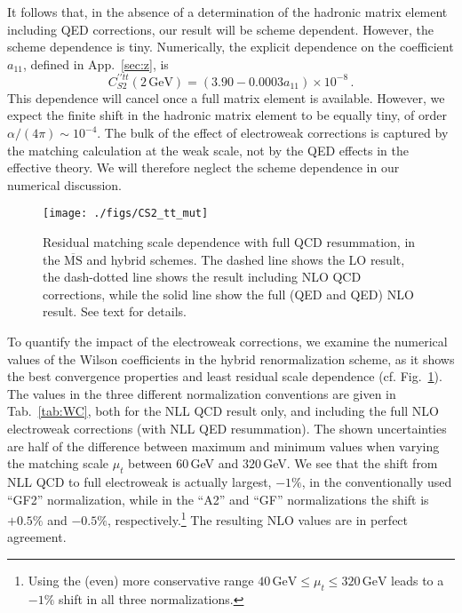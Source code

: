 \documentclass[letter,11pt,DIV=12,abstract=true,numbers=noenddot,titlepage=false,twocolumn=false,draft=false]{scrartcl}
\newcommand{\MS}{$\overline{\text{MS}}$}
\begin{document}
It follows that, in the absence of a determination of the hadronic
matrix element including QED corrections, our result will be scheme
dependent. However, the scheme dependence is tiny. Numerically, the
explicit dependence on the coefficient $a_{11}$, defined in
App.~\ref{sec:z}, is
\begin{equation}
  C_{S2}^{\prime \prime tt}(2\,\text{GeV}) = (3.90 - 0.0003 a_{11} ) \times 10^{-8} \,.
\end{equation}
This dependence will cancel once a full matrix element is
available. However, we expect the finite shift in the hadronic matrix
element to be equally tiny, of order $\alpha/(4\pi) \sim 10^{-4}$. The
bulk of the effect of electroweak corrections is captured by the
matching calculation at the weak scale, not by the QED effects in the
effective theory. We will therefore neglect the scheme dependence in
our numerical discussion.

\begin{figure}[t]
        \centering
        \texttt{[image: ./figs/CS2\_tt\_mut]}
        \caption{Residual matching scale dependence with full QCD
          resummation, in the \MS{} and hybrid schemes. The dashed
          line shows the LO result, the dash-dotted line shows the
          result including NLO QCD corrections, while the solid line
          show the full (QED and QED) NLO result. See text for
          details.
	\label{fig:qcd}}
\end{figure}

To quantify the impact of the electroweak corrections, we examine the
numerical values of the Wilson coefficients in the hybrid
renormalization scheme, as it shows the best convergence properties
and least residual scale dependence (cf. Fig.~\ref{fig:qcd}). The
values in the three different normalization conventions are given in
Tab.~\ref{tab:WC}, both for the NLL QCD result only, and including the
full NLO electroweak corrections (with NLL QED resummation). The shown
uncertainties are half of the difference between maximum and minimum
values when varying the matching scale $\mu_t$ between $60\,$GeV and
$320\,$GeV. We see that the shift from NLL QCD to full electroweak is
actually largest, $-1\%$, in the conventionally used ``GF2''
normalization, while in the ``A2'' and ``GF'' normalizations the shift
is $+0.5\%$ and $-0.5\%$, respectively.\footnote{Using the (even) more
  conservative range $40\,\text{GeV} \leq \mu_t \leq 320\,\text{GeV}$
  leads to a $-1\%$ shift in all three normalizations.} The resulting
NLO values are in perfect agreement.
\end{document}
